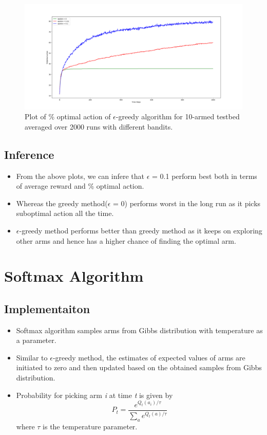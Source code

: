 \documentclass[english]{article}
\begin{document}
\begin{figure}[H]
    \centering
    \includegraphics[width=\linewidth]{e_greedy_opt_action_10arms.png}
    \caption{Plot of \% optimal action of $\epsilon$-greedy algorithm for 10-armed testbed averaged over 2000 runs with different bandits.}
    \label{fig:eg1}
\end{figure}

\subsection{Inference}
\begin{itemize}
    \item From the above plots, we can infere that $\epsilon$ = 0.1 perform best both in terms of average reward and \% optimal action.
    \item Whereas the greedy method($\epsilon$ = 0) performs worst in the long run as it picks suboptimal action all the time.
    \item $\epsilon$-greedy method performs better than greedy method as it keeps on exploring other arms and hence has a higher chance of finding the optimal arm.
\end{itemize}
\pagebreak

\section{Softmax Algorithm}
\subsection{Implementaiton}
\begin{itemize}
    \item Softmax algorithm samples arms from Gibbs distribution with temperature as a parameter.
    \item Similar to $\epsilon$-greedy method, the estimates of expected values of arms are initiated to zero and then updated based on the obtained samples from Gibbs distribution.
    \item Probability for picking arm \emph{i} at time \emph{t} is given by  $$ P_{t} = \dfrac{e^{Q_{t}(a_{i})/\tau}}{\sum_{a}e^{Q_{t}(a)/\tau}} $$ where $\tau$ is the temperature parameter.
\end{itemize}
\end{document}
